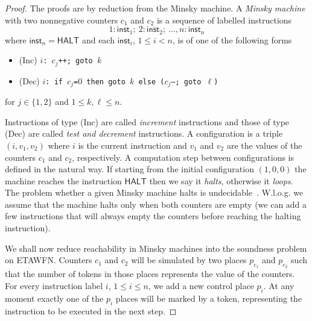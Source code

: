 \begin{proof}
The proofs are by reduction from the Minsky machine.
A \emph{Minsky machine} with two nonnegative counters $c_1$ and $c_2$ is
a sequence of labelled instructions
$$1:\mathsf{inst}_1;\ 2:\mathsf{inst}_2;\ \ldots, n:\mathsf{inst}_n$$
where $\mathsf{inst}_n = \mathsf{HALT}$ 
and each $\mathsf{inst}_i$, $1\le i < n$, is of one of the following forms
\begin{itemize}
\item
{(Inc)} \hspace{5mm} {\tt $i$: $c_j$++; goto $k$}
\item
{(Dec)} \hspace{4mm} {\tt $i$: if $c_j$=$0$ then goto $k$ else 
 ($c_j$--; goto $\ell$)}
\end{itemize}
for $j\in \{1,2\}$ and $1\le k,\ell \le n$.

Instructions of type (Inc) are called \emph{increment} instructions and
those of type (Dec) are called \emph{test and decrement} instructions.
A configuration is a triple $(i, v_1, v_2)$ where $i$ is the current
instruction and $v_1$ and $v_2$ are the values of the counters $c_1$
and $c_2$, respectively. A computation step between configurations is
defined in the natural way. If starting from the initial
configuration $(1,0,0)$ the machine reaches the instruction $\mathsf{HALT}$
then we say it \emph{halts}, otherwise it \emph{loops}.
%
The problem whether a given Minsky machine halts 
is undecidable~\cite{Minsky:book}. W.l.o.g. we assume
that the machine halts only when both counters are empty
(we can add a few instructions that will always empty the counters
before reaching the halting instruction).

We shall now reduce reachability in Minsky machines into the soundness
problem on ETAWFN. Counters $c_1$ and $c_2$ will be simulated
by two places $p_{c_1}$ and $p_{c_2}$ such that the number of
tokens in those places represents the value of the counters.
For every instruction label $i$, $1 \leq i \leq n$, we
add a new control place $p_i$. At any moment exactly one of the $p_i$
places will be marked by a token, representing the instruction
to be executed in the next step.


\end{proof}
